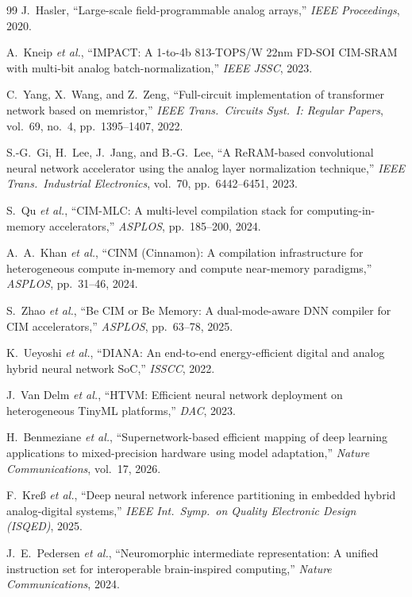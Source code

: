 \documentclass[11pt]{article}
\begin{document}
\begin{thebibliography}{99}
 J.~Hasler, ``Large-scale field-programmable analog arrays,'' \textit{IEEE Proceedings}, 2020.

 A.~Kneip \textit{et al.}, ``IMPACT: A 1-to-4b 813-TOPS/W 22nm FD-SOI CIM-SRAM with multi-bit analog batch-normalization,'' \textit{IEEE JSSC}, 2023.

 C.~Yang, X.~Wang, and Z.~Zeng, ``Full-circuit implementation of transformer network based on memristor,'' \textit{IEEE Trans.\ Circuits Syst.\ I: Regular Papers}, vol.~69, no.~4, pp.~1395--1407, 2022.

 S.-G.~Gi, H.~Lee, J.~Jang, and B.-G.~Lee, ``A ReRAM-based convolutional neural network accelerator using the analog layer normalization technique,'' \textit{IEEE Trans.\ Industrial Electronics}, vol.~70, pp.~6442--6451, 2023.

 S.~Qu \textit{et al.}, ``CIM-MLC: A multi-level compilation stack for computing-in-memory accelerators,'' \textit{ASPLOS}, pp.~185--200, 2024.

 A.~A.~Khan \textit{et al.}, ``CINM (Cinnamon): A compilation infrastructure for heterogeneous compute in-memory and compute near-memory paradigms,'' \textit{ASPLOS}, pp.~31--46, 2024.

 S.~Zhao \textit{et al.}, ``Be CIM or Be Memory: A dual-mode-aware DNN compiler for CIM accelerators,'' \textit{ASPLOS}, pp.~63--78, 2025.

 K.~Ueyoshi \textit{et al.}, ``DIANA: An end-to-end energy-efficient digital and analog hybrid neural network SoC,'' \textit{ISSCC}, 2022.

 J.~Van Delm \textit{et al.}, ``HTVM: Efficient neural network deployment on heterogeneous TinyML platforms,'' \textit{DAC}, 2023.

 H.~Benmeziane \textit{et al.}, ``Supernetwork-based efficient mapping of deep learning applications to mixed-precision hardware using model adaptation,'' \textit{Nature Communications}, vol.~17, 2026.

 F.~Kre\ss{} \textit{et al.}, ``Deep neural network inference partitioning in embedded hybrid analog-digital systems,'' \textit{IEEE Int.\ Symp.\ on Quality Electronic Design (ISQED)}, 2025.

 J.~E.~Pedersen \textit{et al.}, ``Neuromorphic intermediate representation: A unified instruction set for interoperable brain-inspired computing,'' \textit{Nature Communications}, 2024.


\end{thebibliography}
\end{document}
